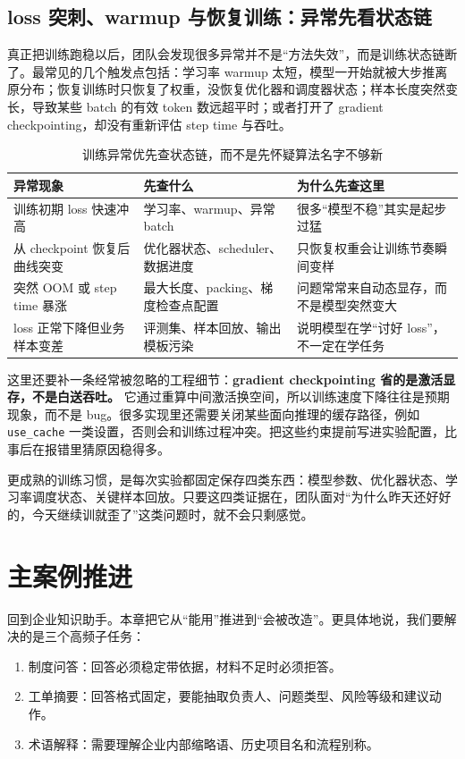 \subsection{loss 突刺、warmup 与恢复训练：异常先看状态链}
真正把训练跑稳以后，团队会发现很多异常并不是“方法失效”，而是训练状态链断了。最常见的几个触发点包括：学习率 warmup 太短，模型一开始就被大步推离原分布；恢复训练时只恢复了权重，没恢复优化器和调度器状态；样本长度突然变长，导致某些 batch 的有效 token 数远超平时；或者打开了 gradient checkpointing，却没有重新评估 step time 与吞吐。

\begin{table}[H]
\centering
\small
\begin{tabularx}{\textwidth}{>{\raggedright\arraybackslash}p{2.8cm}>{\raggedright\arraybackslash}p{3cm}>{\raggedright\arraybackslash}X}
\toprule
\textbf{异常现象} & \textbf{先查什么} & \textbf{为什么先查这里} \\
\midrule
训练初期 loss 快速冲高 & 学习率、warmup、异常 batch & 很多“模型不稳”其实是起步过猛 \\
从 checkpoint 恢复后曲线突变 & 优化器状态、scheduler、数据进度 & 只恢复权重会让训练节奏瞬间变样 \\
突然 OOM 或 step time 暴涨 & 最大长度、packing、梯度检查点配置 & 问题常常来自动态显存，而不是模型突然变大 \\
loss 正常下降但业务样本变差 & 评测集、样本回放、输出模板污染 & 说明模型在学“讨好 loss”，不一定在学任务 \\
\bottomrule
\end{tabularx}
\caption{训练异常优先查状态链，而不是先怀疑算法名字不够新}
\label{tab:finetune-instability-diagnosis}
\end{table}

这里还要补一条经常被忽略的工程细节：\textbf{gradient checkpointing 省的是激活显存，不是白送吞吐。} 它通过重算中间激活换空间，所以训练速度下降往往是预期现象，而不是 bug。很多实现里还需要关闭某些面向推理的缓存路径，例如 \texttt{use\_cache} 一类设置，否则会和训练过程冲突。把这些约束提前写进实验配置，比事后在报错里猜原因稳得多。

更成熟的训练习惯，是每次实验都固定保存四类东西：模型参数、优化器状态、学习率调度状态、关键样本回放。只要这四类证据在，团队面对“为什么昨天还好好的，今天继续训就歪了”这类问题时，就不会只剩感觉。

\section{主案例推进}
回到企业知识助手。本章把它从“能用”推进到“会被改造”。更具体地说，我们要解决的是三个高频子任务：
\begin{enumerate}
  \item {\heiti 制度问答}：回答必须稳定带依据，材料不足时必须拒答。
  \item {\heiti 工单摘要}：回答格式固定，要能抽取负责人、问题类型、风险等级和建议动作。
  \item {\heiti 术语解释}：需要理解企业内部缩略语、历史项目名和流程别称。
\end{enumerate}

